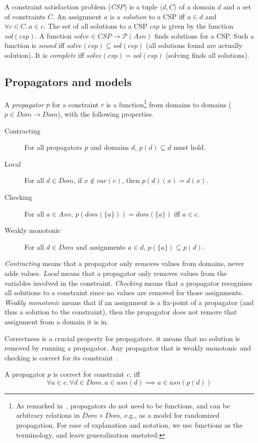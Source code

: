 \documentclass[runningheads]{llncs}
\newcommand{\Asn}{\ensuremath{\mathit{Asn}}}
\newcommand{\Dom}{\ensuremath{\mathit{Dom}}}
\newcommand{\sol}{\ensuremath{\mathit{sol}}}
\newcommand{\solve}{\ensuremath{\mathit{solve}}}
\begin{document}
A constraint satisfaction problem (\emph{CSP}) is a tuple
$\langle d, C \rangle$ of a domain $d$ and a set of constraints
$C$. An assignment $a$ is a \emph{solution} to a CSP iff $a\in d$ and
$\forall c\in C.\, a\in c$. The set of all solutions to a CSP $csp$ is
given by the function $\sol(csp)$. A function
$\solve\in CSP\to \mathcal{P}(\Asn)$ finds solutions for a CSP. Such
a function is \emph{sound} iff $\solve(csp)\subseteq sol(csp)$ (all
solutions found are actually solution). It is \emph{complete} iff
$\solve(csp)=\sol(csp)$ (solving finds all solutions).

\subsection{Propagators and models}
\label{sec:cp:propagators}

A \emph{propagator} $p$ for a constraint $c$ is a function\footnote{As
  remarked in~\cite{SchulteTack:CP:2009}, propagators do not need to be
  functions, and can be arbitrary relations in $\Dom\times \Dom$,
  e.g., as a model for randomized propagation. For ease of explanation
  and notation, we use functions as the terminology, and leave
  generalization unstated.} from domains to domains ($p\in\Dom\to\Dom$), with the
following properties.

\begin{description}
\item[Contracting] For all propagators $p$ and domains $d$,
$p(d)\subseteq d$ must hold. 
\item[Local] For all $d\in \Dom$, if $x\not\in var(c)$, then $p(d)(x) = d(x)$.
\item[Checking] For all $a\in \Asn$, $p(dom(\{a\}))=dom(\{a\})$
  iff $a\in c$.
\item[Weakly monotonic] For all $d\in \Dom$ and assignments $a\in d$,
  $p(\{a\})\subseteq p(d)$.
\end{description}

\emph{Contracting} means that a propagator only removes values from
domains, never adds values. \emph{Local} means that a propagator only
removes values from the variables involved in the
constraint. \emph{Checking} means that a propagator recognizes all
solutions to a constraint since no values are removed for those
assignments. \emph{Weakly monotonic} means that if an assignment is a
fix-point of a propagator (and thus a solution to the constraint),
then the propagator does not remove that assignment from a domain it
is in.

Correctness is a crucial property for propagators. it means that no
solution is removed by running a propagator. Any propagator that is
weakly monotonic and checking is correct for its
constraint~\cite{SchulteTack:CP:2009}.
\begin{definition}[Correct] \label{def:correct} A propagator $p$ is
  correct for constraint $c$, iff
  $$\forall a\in c.\, \forall d\in \Dom.\, a\in asn(d)\implies a\in
  asn(p(d))$$
\end{definition}
\end{document}
